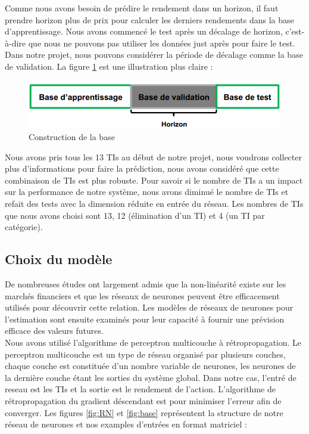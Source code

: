 Comme nous avons besoin de prédire le rendement dans un horizon, il faut prendre horizon plus de prix pour calculer les derniers rendements dans la base d'apprentissage. Nous avons commencé le test après un décalage de horizon, c'est-à-dire que nous ne pouvons pas utiliser les données just après pour faire le test. Dans notre projet, nous pouvons considérer la période de décalage comme la base de validation. La figure \ref{fig:BA} est une illustration plus claire : \\

\begin{figure}[H]
	\centering
	\includegraphics[width=.5\linewidth, scale=0.2]
	{plot/BA.png}
	\caption{Construction de la base}
	\label{fig:BA}
\end{figure}

Nous avons pris tous les 13 TIs au début de notre projet, nous voudrons collecter plus d’informations pour faire la prédiction, nous avons considéré que cette combinaison de TIs est plus robuste. Pour savoir si le nombre de TIs a un impact sur la performance de notre système, nous avons diminué le nombre de TIs et refait des tests avec la dimension réduite en entrée du réseau. Les nombres de TIs que nous avons choisi sont 13, 12 (élimination d'un TI) et 4 (un TI par catégorie).

\subsection{Choix du modèle}

De nombreuses études ont largement admis que la non-linéarité existe sur les marchés financiers et que les réseaux de neurones peuvent être efficacement utilisés pour découvrir cette relation. Les modèles de réseaux de neurones pour l'estimation sont ensuite examinés pour leur capacité à fournir une prévision efficace des valeurs futures.\\

Nous avons utilisé l'algorithme de perceptron multicouche à rétropropagation. Le perceptron multicouche est un type de réseau organisé par plusieurs couches, chaque couche est constituée d'un nombre variable de neurones, les neurones de la dernière couche étant les sorties du système global. Dans notre cas, l'entré de reseau est les TIs et la sortie est le rendement de l'action. L'algorithme de rétropropagation du gradient déscendant est pour minimiser l'erreur afin de converger. Les figures \ref{fig:RN} et \ref{fig:base} représentent la structure de notre réseau de neurones et nos examples d'entrées en format matriciel :\\

